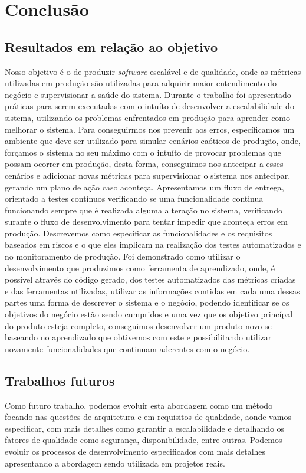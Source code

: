\part{Conclusão}
  \chapter{Resultados em relação ao objetivo}
    Nosso objetivo é o de produzir \textit{software} escalável e de qualidade,
    onde as métricas utilizadas em produção são utilizadas para adquirir maior
    entendimento do negócio e supervisionar a saúde do sistema. \newline
    Durante o trabalho foi apresentado práticas para serem executadas com o
    intuíto de desenvolver a escalabilidade do sistema, utilizando os problemas
    enfrentados em produção para aprender como melhorar o sistema. Para conseguirmos
    nos prevenir aos erros, específicamos um ambiente que deve ser utilizado para
    simular cenários caóticos de produção, onde, forçamos o sistema no seu máximo
    com o intuíto de provocar problemas que possam ocorrer em produção, desta
    forma, conseguimos nos antecipar a esses cenários e adicionar novas métricas
    para supervisionar o sistema nos antecipar, gerando um plano de ação caso
    aconteça. \newline
    Apresentamos um fluxo de entrega, orientado a testes contínuos verificando
    se uma funcionalidade continua funcionando sempre que é realizada alguma
    alteração no sistema, verificando surante o fluxo de desenvolvimento para
    tentar impedir que aconteça erros em produção. Descrevemos como específicar
    as funcionalidades e os requisitos baseados em riscos e o que eles implicam
    na realização dos testes automatizados e no monitoramento de produção. \newline
    Foi demonstrado como utilizar o desenvolvimento que produzimos como ferramenta de
    aprendizado, onde, é possível através do código gerado, dos testes automatizados
    das métricas criadas e das ferramentas utilizadas, utilizar as informações
    contidas em cada uma dessas partes uma forma de descrever o sistema e o
    negócio, podendo identificar se os objetivos do negócio estão sendo cumpridos
    e uma vez que os objetivo princípal do produto esteja completo, conseguimos
    desenvolver um produto novo se baseando no aprendizado que obtivemos com este
    e possibilitando utilizar novamente funcionalidades que continuam aderentes
    com o negócio.

  \chapter{Trabalhos futuros}
    Como futuro trabalho, podemos evoluir esta abordagem como um método focando
    nas questões de arquitetura e em requisitos de qualidade, aonde vamos especificar,
    com mais detalhes como garantir a escalabilidade e detalhando os fatores de
    qualidade como segurança, disponibilidade, entre outras. Podemos evoluir os
    processos de desenvolvimento especificados com mais detalhes apresentando a
    abordagem sendo utilizada em projetos reais.
